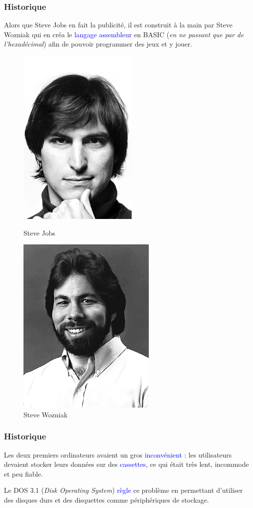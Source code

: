 \documentclass[aspectratio=169]{beamer}
\begin{document}
\begin{frame}
  \frametitle{Historique}
  Alors que Steve Jobs en fait la publicité, il est construit à la main par
  Steve Wozniak qui en créa le \textcolor{blue}{langage assembleur} en BASIC
  (\textit{en ne passant que par de l'hexadécimal}) afin de pouvoir programmer
  des jeux et y jouer.

  \begin{figure}
  \centering
  \begin{minipage}{.455\textwidth}
    \centering
    \includegraphics[width=.33\linewidth]{textures/images/mac/jobs.png}
    \caption{Steve Jobs}
  \end{minipage}
  \begin{minipage}{.39\textwidth}
    \centering
    \includegraphics[width=.47\linewidth]{textures/images/mac/wozniak.png}
    \caption{Steve Wozniak}
  \end{minipage}
  \end{figure}
\end{frame}

\begin{frame}
  \frametitle{Historique}
  Les deux premiers ordinateurs avaient un gros \textcolor{blue}{inconvénient}
  : les utilisateurs devaient stocker leurs données sur des
  \textcolor{blue}{cassettes}, ce qui était très lent, incommode et peu fiable.

    \hspace{0.5cm}

  Le DOS 3.1 (\textit{Disk Operating System}) \textcolor{blue}{règle} ce
  problème en permettant d’utiliser des disques durs et des disquettes comme
  périphériques de stockage.
\end{frame}
\end{document}
